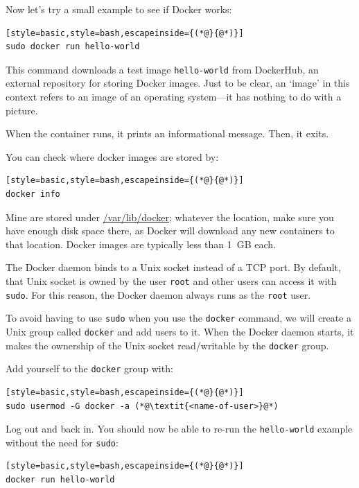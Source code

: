 \documentclass[12pt, a4paper, twoside, openany, titlepage]{book}
\begin{document}
Now let's try a small example to see if Docker works:
\begin{lstlisting}[style=basic,style=bash,escapeinside={(*@}{@*)}]
sudo docker run hello-world
\end{lstlisting}

This command downloads a test image \texttt{hello-world} from DockerHub, an external repository for storing Docker images. Just to be clear, an `image' in this context refers to an image of an operating system---it has nothing to do with a picture.

When the container runs, it prints an informational message. Then, it exits.

You can check where docker images are stored by:
\begin{lstlisting}[style=basic,style=bash,escapeinside={(*@}{@*)}]
docker info
\end{lstlisting}
Mine are stored under \url{/var/lib/docker}; whatever the location, make sure you have enough disk space there, as Docker will download any new containers to that location. Docker images are typically less than 1~GB each.

The Docker daemon binds to a Unix socket instead of a TCP port. By default, that Unix socket is owned by the user \texttt{root} and other users can access it with \texttt{sudo}. For this reason, the Docker daemon always runs as the \texttt{root} user.

To avoid having to use \texttt{sudo} when you use the \texttt{docker} command, we will create a Unix group called \texttt{docker} and add users to it. When the Docker daemon starts, it makes the ownership of the Unix socket read/writable by the \texttt{docker} group.

Add yourself to the \texttt{docker} group with:
\begin{lstlisting}[style=basic,style=bash,escapeinside={(*@}{@*)}]
sudo usermod -G docker -a (*@\textit{<name-of-user>}@*)
\end{lstlisting}
Log out and back in. You should now be able to re-run the \texttt{hello-world} example without the need for \texttt{sudo}:
\begin{lstlisting}[style=basic,style=bash,escapeinside={(*@}{@*)}]
docker run hello-world
\end{lstlisting}
\end{document}
